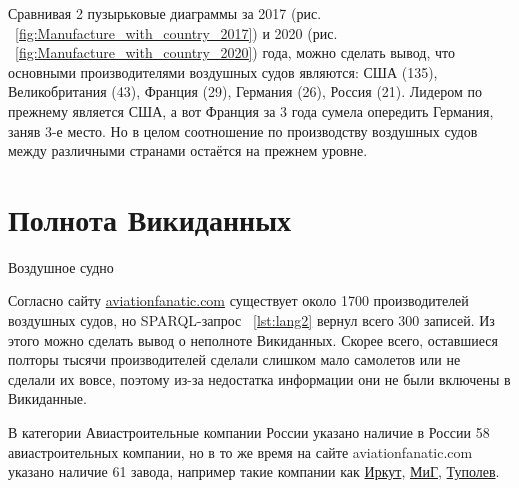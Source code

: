 Сравнивая 2 пузырьковые диаграммы за 2017 (рис. ~\ref{fig:Manufacture_with_country_2017}) и 2020 (рис. ~\ref{fig:Manufacture_with_country_2020}) года, можно сделать вывод, что основными производителями воздушных судов являются: США (135), Великобритания (43), Франция (29), Германия (26), Россия (21). Лидером по прежнему является США, а вот Франция за 3 года сумела опередить Германия, заняв 3-е место. Но в целом соотношение по производству воздушных судов между различными странами остаётся на прежнем уровне.

\section{Полнота Викиданных}

\label{aircraft_question_5}


\begin{marginfigure}[0.0cm]
{
\setlength{\fboxsep}{0pt}%
\setlength{\fboxrule}{1pt}%
%
}
  \caption{Воздушное судно}%
  \label{fig:airship_question_aircraft}%
\end{marginfigure}


Согласно сайту \href{https://www.aviationfanatic.com/}{aviationfanatic.com} существует около \num{1700} производителей воздушных судов, но SPARQL-запрос ~\ref{lst:lang2} вернул всего 300 записей. Из этого можно сделать вывод о неполноте Викиданных. Скорее всего, оставшиеся полторы тысячи производителей сделали слишком мало самолетов или не сделали их вовсе, поэтому из-за недостатка информации они не были включены в Викиданные.

В категории Авиастроительные компании России указано наличие в России 58 авиастроительных компании, но в то же время на сайте aviationfanatic.com указано наличие 61 завода, например такие компании как \href{https://clck.ru/RxFCs}{Иркут}, \href{https://clck.ru/QR6qZ}{МиГ}, \href{https://clck.ru/RxFG3}{Туполев}.



